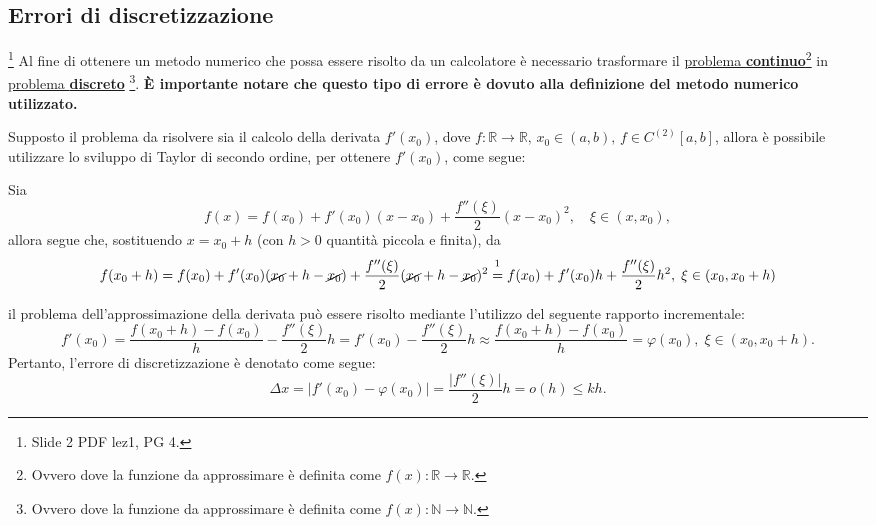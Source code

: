 \subsection{Errori di discretizzazione}\label{ssec:errori_discretizzazione}\footnote{Slide 2 PDF lez1, PG 4.}
Al fine di ottenere un \gls{metodo numerico} che possa essere risolto da un calcolatore è necessario trasformare il \underline{problema \textbf{continuo}}\footnote{Ovvero dove la funzione da approssimare è definita come $f(x):\mathbb R\rightarrow\mathbb R$.} in \underline{problema \textbf{discreto}} \footnote{Ovvero dove la funzione da approssimare è definita come $f(x):\mathbb N\rightarrow\mathbb N$.}. \textbf{È importante notare che questo tipo di errore è dovuto alla definizione del \gls{metodo numerico} utilizzato.}

Supposto il problema da risolvere sia il calcolo della derivata $f'(x_0)$, dove $f:\mathbb R\rightarrow\mathbb R,\, x_0\in (a,b),\, f\in C^{(2)}[a,b]$, allora è possibile utilizzare lo sviluppo di Taylor di secondo ordine, per ottenere $f'(x_0)$, come segue:

Sia
\begin{equation*}
	f(x)=f(x_0)+f'(x_0)(x-x_0)+\frac{f''(\xi)}{2}(x-x_0)^2,\quad \xi\in(x,x_0),
\end{equation*}
allora segue che, sostituendo $x=x_0+h$ (con $h>0$ quantità piccola e finita), da
\begin{equation*}
	f(x_0+h)=f(x_0)+f'(x_0)(\cancel{x_0}+h-\cancel{x_0})+\frac{f''(\xi)}{2}(\cancel{x_0}+h-\cancel{x_0})^2\overset{\footnotemark}{=}f(x_0)+f'(x_0)h+\frac{f''(\xi)}{2}h^2,\; \xi\in(x_0,x_0+h)
\end{equation*}


\noindent il problema dell'approssimazione della derivata può essere risolto mediante l'utilizzo del seguente rapporto incrementale:
\begin{equation}\label{eq:approxF'ErrDiscr}
	f'(x_0)=\frac{f(x_0+h)-f(x_0)}{h}-\frac{f''(\xi)}{2}h=f'(x_0)-\frac{f''(\xi)}{2}h\approx\frac{f(x_0+h)-f(x_0)}{h}=\varphi(x_0),\; \xi\in(x_0,x_0+h).
\end{equation}
Pertanto, l'errore di discretizzazione è denotato come segue:
\begin{equation*}
	\Delta x = |f'(x_0)-\varphi(x_0)|=\frac{|f''(\xi)|}{2}h = o(h)\leq kh.
\end{equation*}

